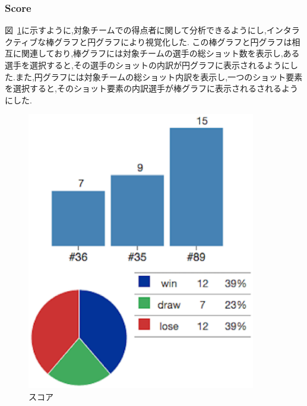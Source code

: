 \documentclass[sotsuron]{kuee}
\begin{document}
			\subsubsection{Score}
				図~\ref{fig:score}に示すように,対象チームでの得点者に関して分析できるようにし,インタラクティブな棒グラフと円グラフにより視覚化した.
				この棒グラフと円グラフは相互に関連しており,棒グラフには対象チームの選手の総ショット数を表示し,ある選手を選択すると,その選手のショットの内訳が円グラフに表示されるようにした.また,円グラフには対象チームの総ショット内訳を表示し,一つのショット要素を選択すると,そのショット要素の内訳選手が棒グラフに表示されるされるようにした.
					\begin{figure}
						\begin{center}
							\includegraphics[width=10cm]{./eps/score.eps}
						\end{center}
						\caption{スコア}
				  		\label{fig:score}
					\end{figure}
\end{document}

